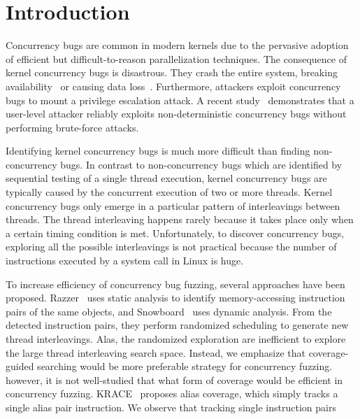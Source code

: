 \section{Introduction}
\label{s:intro}


Concurrency bugs are common in modern kernels due to 
the pervasive adoption of efficient but difficult-to-reason
parallelization techniques.
The consequence of kernel concurrency bugs is disastrous. They crash
the entire system, breaking availability~\cite{cve201812232, snowboardbug} or causing data loss~\cite{dataloss}.
Furthermore, attackers 
exploit concurrency bugs to mount a privilege escalation attack.
A recent study~\cite{exprace} demonstrates that a user-level attacker 
reliably exploits non-deterministic concurrency bugs without performing
brute-force attacks.

Identifying kernel concurrency bugs is much more difficult than 
finding non-concurrency bugs. 
In contrast to non-concurrency bugs which are identified by 
sequential testing of a single thread execution,
kernel concurrency bugs are typically caused by the concurrent execution 
of two or more threads.
Kernel concurrency bugs only emerge in a particular pattern of 
interleavings between threads. The thread interleaving happens 
rarely because it takes place only when a certain timing condition is met.
Unfortunately, to discover concurrency bugs, exploring all the possible interleavings is not practical because 
the number of instructions executed by a system call in Linux is huge.

To increase efficiency of concurrency bug fuzzing, several approaches
have been proposed.  Razzer~\cite{razzer} uses static analysis to 
identify memory-accessing instruction pairs of the same objects, and 
Snowboard~\cite{snowboard} uses dynamic analysis. 
From the detected instruction pairs, they perform randomized 
scheduling to generate new thread interleavings. Alas,
the randomized exploration are inefficient to explore the large 
thread interleaving search space. Instead, we emphasize that 
coverage-guided searching would be more preferable strategy 
for concurrency fuzzing. however, it is not well-studied that 
what form of coverage would be efficient in concurrency fuzzing.
KRACE~\cite{krace} proposes alias coverage, which simply tracks 
a single alias pair instruction. We observe that tracking single
instruction pairs


